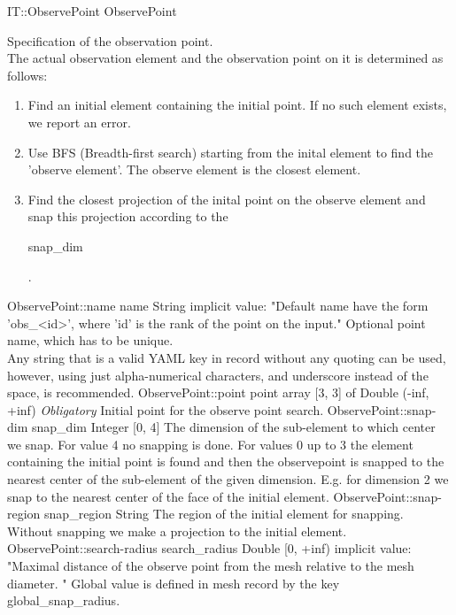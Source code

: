 \begin{RecordType}
	{IT::ObservePoint}
	{ObservePoint}
	{}%
	{}%
	{{{{Specification of the observation point.}\\{
The actual observation element and the observation point on it is determined as follows:}
% 
}
\begin{enumerate}
\item {Find an initial element containing the initial point.
If no such element exists, we report an error.}
\item {Use BFS (Breadth-first search) starting from the inital element to find the 'observe element'. The observe element is the closest element.}
\item {Find the closest projection of the inital point on the observe element and snap this projection according to the }\begin{ttfamily}snap{\_}dim\end{ttfamily}{.}
\end{enumerate}
}}
		\RecKey
			{ObservePoint::name}
			{name}
			{{String}}{}
			{implicit value: "{Default name have the form 'obs{\_}{\textless}id{\textgreater}', where 'id' is the rank of the point on the input.}"}
			{{{Optional point name, which has to be unique.}\\{
Any string that is a valid YAML key in record without any quoting can be used, however, using just alpha-numerical characters, and underscore instead of the space, is recommended.}%
}}
		\RecKey
			{ObservePoint::point}
			{point}
			{{array [3, 3] of }{Double (-inf, +inf)}}{}
			{ \it{Obligatory}}
			{{{Initial point for the observe point search.}%
}}
		\RecKey
			{ObservePoint::snap-dim}
			{snap{\_}dim}
			{{Integer [0, 4]}}{}
			{ }
			{{{The dimension of the sub-element to which center we snap.
For value 4 no snapping is done.
For values 0 up to 3 the element containing the initial point is found and then the observepoint is snapped to the nearest center of the sub-element of the given dimension.
E.g. for dimension 2 we snap to the nearest center of the face of the initial element.}%
}}
		\RecKey
			{ObservePoint::snap-region}
			{snap{\_}region}
			{{String}}{}
			{ }
			{{{The region of the initial element for snapping.
Without snapping we make a projection to the initial element.}%
}}
		\RecKey
			{ObservePoint::search-radius}
			{search{\_}radius}
			{{Double [0, +inf)}}{}
			{implicit value: "{Maximal distance of the observe point from the mesh relative to the mesh diameter. }"}
			{{{Global value is defined in mesh record by the key global{\_}snap{\_}radius.}%
}}
\end{RecordType}
